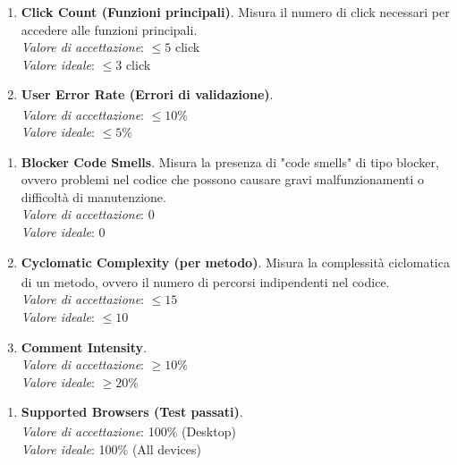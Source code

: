 \documentclass[a4paper,11pt]{article}
\newcommand{\G}{\textsubscript{\scalebox{0.6}{\textbf{G}}}}
\begin{document}
\begin{enumerate}[label=\textbf{MPD\arabic*}, leftmargin=4.5em]
    \item[\textbf{MPD11}]  \textbf{Click Count (Funzioni principali)}. Misura il numero di click necessari per accedere alle funzioni principali.\\
    \textit{Valore di accettazione}: $\leq 5$ click\\
    \textit{Valore ideale}: $\leq 3$ click

    \item[\textbf{MPD12}] \textbf{User Error Rate (Errori di validazione\G{})}.\\
    \textit{Valore di accettazione}: $\leq 10\%$\\
    \textit{Valore ideale}: $\leq 5\%$
\end{enumerate}
\subsubsubsection{Manutenibilità\G{}}
\begin{enumerate}[label=\textbf{MPD\arabic*}, leftmargin=4.5em]
    \item[\textbf{MPD13}] \textbf{Blocker Code Smells}. Misura la presenza di "code smells" di tipo blocker, ovvero problemi nel codice che possono causare gravi malfunzionamenti o difficoltà di manutenzione.\\
    \textit{Valore di accettazione}: 0\\
    \textit{Valore ideale}: 0

    \item[\textbf{MPD14}] \textbf{Cyclomatic Complexity\G{} (per metodo)}. Misura la complessità ciclomatica\G{} di un metodo, ovvero il numero di percorsi indipendenti nel codice.\\
    \textit{Valore di accettazione}: $\leq 15$\\
    \textit{Valore ideale}: $\leq 10$

    \item[\textbf{MPD15}] \textbf{Comment Intensity}.\\
    \textit{Valore di accettazione}: $\geq 10\%$\\
    \textit{Valore ideale}: $\geq 20\%$
\end{enumerate}
\begin{enumerate}[label=\textbf{MPD\arabic*}, leftmargin=4.5em]
    \item[\textbf{MPD16}] \textbf{Supported Browsers (Test\G{} passati)}.\\
    \textit{Valore di accettazione}: 100\% (Desktop)\\
    \textit{Valore ideale}: 100\% (All devices)
\end{enumerate}
\end{document}
